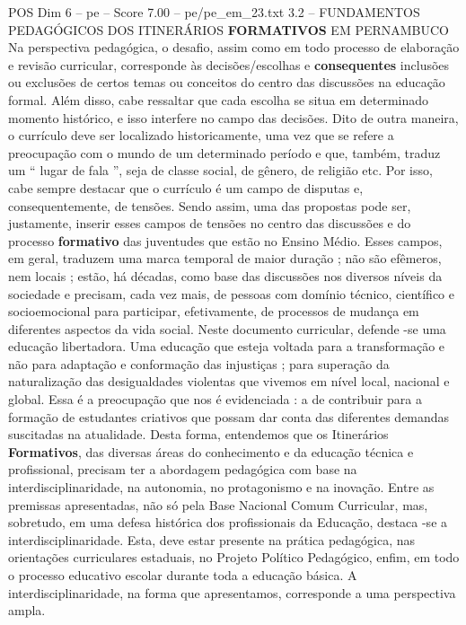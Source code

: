 \begin{textsample}{POS Dim 6 – pe – Score 7.00 – pe/pe\_em\_23.txt}  \label{ex:f6_pos_255}
3.2 – FUNDAMENTOS PEDAGÓGICOS DOS ITINERÁRIOS \textbf{FORMATIVOS} EM PERNAMBUCO Na perspectiva pedagógica, o desafio, assim como em todo processo de elaboração e revisão curricular, corresponde às decisões/escolhas e \textbf{consequentes} inclusões ou exclusões de certos temas ou conceitos do centro das discussões na educação formal.
Além disso, cabe ressaltar que cada escolha se situa em determinado momento histórico, e isso interfere no campo das decisões.
Dito de outra maneira, o currículo deve ser localizado historicamente, uma vez que se refere a preocupação com o mundo de um determinado período e que, também, traduz um “ lugar de fala ”, seja de classe social, de gênero, de religião etc.
Por isso, cabe sempre destacar que o currículo é um campo de disputas e, consequentemente, de tensões.
Sendo assim, uma das propostas pode ser, justamente, inserir esses campos de tensões no centro das discussões e do processo \textbf{formativo} das juventudes que estão no Ensino Médio.
Esses campos, em geral, traduzem uma marca temporal de maior duração ; não são efêmeros, nem locais ; estão, há décadas, como base das discussões nos diversos níveis da sociedade e precisam, cada vez mais, de pessoas com domínio técnico, científico e socioemocional para participar, efetivamente, de processos de mudança em diferentes aspectos da vida social.
Neste documento curricular, defende -se uma educação libertadora.
Uma educação que esteja voltada para a transformação e não para adaptação e conformação das injustiças ; para superação da naturalização das desigualdades violentas que vivemos em nível local, nacional e global.
Essa é a preocupação que nos é evidenciada : a de contribuir para a formação de estudantes criativos que possam dar conta das diferentes demandas suscitadas na atualidade.
Desta forma, entendemos que os Itinerários \textbf{Formativos}, das diversas áreas do conhecimento e da educação técnica e profissional, precisam ter a abordagem pedagógica com base na interdisciplinaridade, na autonomia, no protagonismo e na inovação.
Entre as premissas apresentadas, não só pela Base Nacional Comum Curricular, mas, sobretudo, em uma defesa histórica dos profissionais da Educação, destaca -se a interdisciplinaridade.
Esta, deve estar presente na prática pedagógica, nas orientações curriculares estaduais, no Projeto Político Pedagógico, enfim, em todo o processo educativo escolar durante toda a educação básica.
A interdisciplinaridade, na forma que apresentamos, corresponde a uma perspectiva ampla.

\end{textsample}
